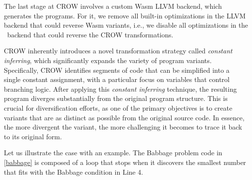 The last stage at CROW involves a custom Wasm LLVM backend, which generates the \wasm programs.
For it, we remove all built-in optimizations in the LLVM backend that could reverse Wasm variants, i.e., we disable all optimizations in the \wasm\ backend that could reverse the CROW transformations.

\vspace{-2cm}

\label{CROW:constant_inferring}
CROW inherently introduces a novel transformation strategy called \emph{constant inferring}, which significantly expands the variety of \Wasm program variants. 
Specifically, CROW identifies segments of code that can be simplified into a single constant assignment, with a particular focus on variables that control branching logic. 
After applying this \emph{constant inferring} technique, the resulting program diverges substantially from the original program structure. 
This is crucial for diversification efforts, as one of the primary objectives is to create variants that are as distinct as possible from the original source code. 
In essence, the more divergent the variant, the more challenging it becomes to trace it back to its original form.




Let us illustrate the case with an example.
The Babbage problem code in \autoref{babbage} is composed of a loop that stops when it discovers the smallest number that fits with the Babbage condition in Line 4.



